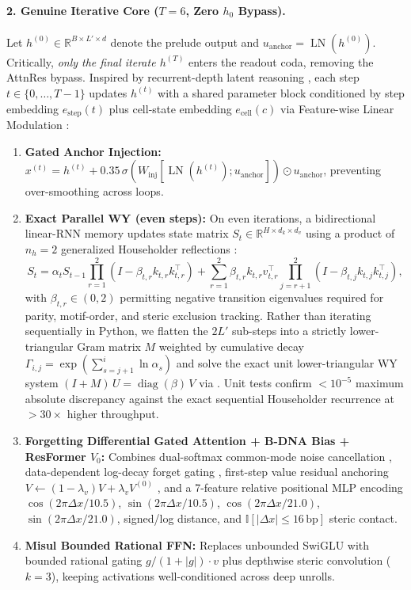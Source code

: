 \documentclass[10.5pt,a4paper]{article}
\begin{document}
\paragraph{2. Genuine Iterative Core ($T=6$, Zero $h_0$ Bypass).}
Let $h^{(0)} \in \mathbb{R}^{B\times L'\times d}$ denote the prelude output and $u_{\text{anchor}}=\operatorname{LN}(h^{(0)})$. Critically, \emph{only the final iterate $h^{(T)}$} enters the readout coda, removing the AttnRes bypass. Inspired by recurrent-depth latent reasoning \citep{geiping2025}, each step $t\in\{0,\dots,T-1\}$ updates $h^{(t)}$ with a shared parameter block conditioned by step embedding $e_{\text{step}}(t)$ plus cell-state embedding $e_{\text{cell}}(c)$ via Feature-wise Linear Modulation \citep{perez2018}:
\begin{enumerate}
\item \textbf{Gated Anchor Injection:} $x^{(t)} = h^{(t)} + 0.35\,\sigma(W_{\text{inj}}[\operatorname{LN}(h^{(t)}); u_{\text{anchor}}]) \odot u_{\text{anchor}}$, preventing over-smoothing across loops.
\item \textbf{Exact Parallel WY  (even steps):} On even iterations, a bidirectional linear-RNN memory updates state matrix $S_t \in \mathbb{R}^{H\times d_k\times d_v}$ using a product of $n_h=2$ generalized Householder reflections \citep{siems2025}:
\begin{equation}
S_t = \alpha_t S_{t-1} \prod_{r=1}^{2}\!\left(I - \beta_{t,r} k_{t,r} k_{t,r}^\top\right) + \sum_{r=1}^{2} \beta_{t,r} k_{t,r} v_{t,r}^\top \prod_{j=r+1}^{2}\!\left(I - \beta_{t,j} k_{t,j} k_{t,j}^\top\right),
\end{equation}
with $\beta_{t,r}\in(0,2)$ permitting negative transition eigenvalues required for parity, motif-order, and steric exclusion tracking. Rather than iterating sequentially in Python, we flatten the $2L'$ sub-steps into a strictly lower-triangular Gram matrix $M$ weighted by cumulative decay $\Gamma_{i,j}=\exp(\sum_{s=j+1}^i \ln\alpha_s)$ and solve the exact unit lower-triangular WY system $(I + M)\,U = \operatorname{diag}(\beta)\,V$ via . Unit tests confirm $<10^{-5}$ maximum absolute discrepancy against the exact sequential Householder recurrence at $>30\times$ higher throughput.
\item \textbf{Forgetting Differential Gated Attention + B-DNA Bias + ResFormer $V_0$:} Combines dual-softmax common-mode noise cancellation \citep{ye2025}, data-dependent log-decay forget gating \citep{lin2025}, first-step value residual anchoring $V \leftarrow (1-\lambda_v)V + \lambda_v V^{(0)}$ \citep{zhou2025}, and a 7-feature relative positional MLP encoding $\cos(2\pi\Delta x/10.5)$, $\sin(2\pi\Delta x/10.5)$, $\cos(2\pi\Delta x/21.0)$, $\sin(2\pi\Delta x/21.0)$, signed/log distance, and $\mathbb{I}[|\Delta x|\le 16\,\text{bp}]$ steric contact.
\item \textbf{Misul Bounded Rational FFN:} Replaces unbounded SwiGLU with bounded rational gating $g/(1+|g|)\cdot v$ plus depthwise steric convolution ($k=3$), keeping activations well-conditioned across deep unrolls.
\end{enumerate}
\end{document}
